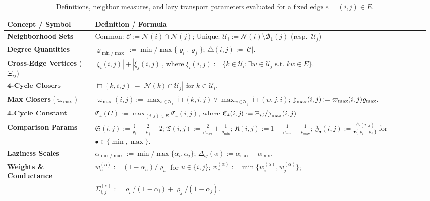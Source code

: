 \documentclass[twoside,11pt]{article}
\numberwithin{equation}{section}
\numberwithin{theorem}{section}
\numberwithin{example}{section}
\newcommand{\sho}{\textup{\text{\th}}}
\begin{document}
\begin{table}
\caption{Definitions, neighbor measures, and lazy transport parameters evaluated for a fixed edge $e=(i,j) \in E$.}
\label{tab:definitions}
\centering
\small
\renewcommand{\arraystretch}{1.3}
\begin{tabular}{@{}p{}p{}@{}}
\toprule
\textbf{Concept / Symbol} & \textbf{Definition / Formula} \\
\midrule
\textbf{Neighborhood Sets} & Common: $\mathcal C := \mathcal N(i)\cap\mathcal N(j)$; Unique: $\mathcal U_i := \mathcal N(i)\setminus\mathcal B_1(j)$ (resp.\ $\mathcal U_j$). \\
\textbf{Degree Quantities} &  $\varrho_{\min/\max} := \min/\max\{\varrho_i,\varrho_j\}$; $\triangle(i,j) := |\mathcal C|$. \\
\textbf{Cross-Edge Vertices} ($\Xi_{ij}$) & $|\xi_i(i,j)| + |\xi_j(i,j)|$, where $\xi_i(i,j) := \{k \in \mathcal U_i : \exists w \in \mathcal U_j \text{ s.t. } kw \in E\}$. \\
\textbf{4-Cycle Closers} & $\widetilde\Box(k,i,j) := |\mathcal N(k)\cap \mathcal U_j|$ for $k \in \mathcal U_i$. \\
\textbf{Max Closers} ($\varpi_{\max}$) & $\varpi_{\max}(i,j) := \max_{k\in\mathcal U_i} \widetilde\Box(k,i,j) \vee \max_{w\in\mathcal U_j} \widetilde\Box(w,j,i)$; $\sho_{\max}(i,j) := \varpi_{\max}(i,j)\varrho_{\max}$. \\
\textbf{4-Cycle Constant} & $\mathfrak C_4(G) := \max_{(i,j)\in E} \mathfrak C_4(i,j)$, where $\mathfrak C_4(i,j) := \Xi_{ij} / \sho_{\max}(i,j)$. \\
\textbf{Comparison Params} & $\mathfrak S(i,j) := \frac{2}{\varrho_i}+\frac{2}{\varrho_j}-2$;  $\mathfrak T(i,j) := \frac{2}{\varrho_{\max}} + \frac{1}{\varrho_{\min}}$; $\mathfrak K(i,j) := 1 - \frac{1}{\varrho_{\min}} - \frac{1}{\varrho_{\max}}$; $\mathfrak Z_\bullet(i,j) := \frac{\triangle(i,j)}{\bullet\{\varrho_i,\varrho_j\}}$ for $\bullet \in \{\min,\max\}$. \\
\midrule
\textbf{Laziness Scales} & $\alpha_{\min/\max} := \min/\max\{\alpha_i,\alpha_j\}$; \quad $\Delta_{ij}(\alpha) := \alpha_{\max} - \alpha_{\min}$. \\
\textbf{Weights \& Conductance} & $w^{(\alpha)}_u := (1-\alpha_u)/{\varrho_u}$ for $u\in\{i,j\}$; \quad $w^{(\alpha)}_\wedge := \min\{w^{(\alpha)}_i,w^{(\alpha)}_j\}$; \\
& $\Sigma^{(\alpha)}_{i,j} := \varrho_i/(1-\alpha_i)+{\varrho_j}/({1-\alpha_j})$. \\

\end{tabular}
\end{table}
\end{document}
